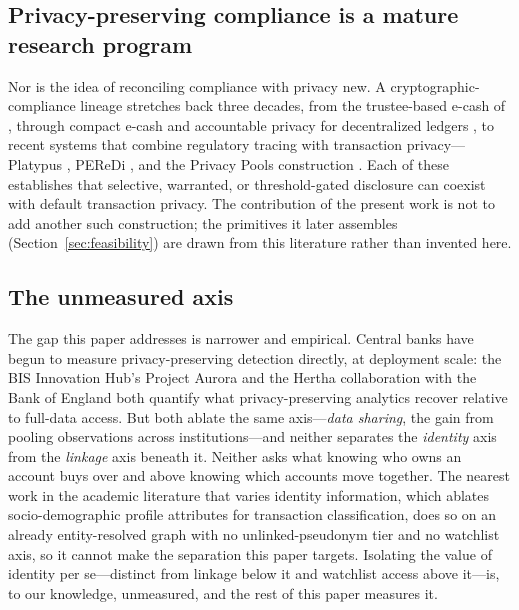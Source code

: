 \documentclass[11pt]{article}
\begin{document}
\subsection{Privacy-preserving compliance is a mature research program}

Nor is the idea of reconciling compliance with privacy new. A cryptographic-compliance lineage
stretches back three decades, from the trustee-based e-cash of \citet{CamenischMaurerStadler1996},
through compact e-cash \citep{Camenisch2005CompactEcash} and accountable privacy for decentralized
ledgers \citep{Garman2016Accountable}, to recent systems that combine regulatory tracing with
transaction privacy---Platypus \citep{Wuest2022Platypus}, PEReDi \citep{Kiayias2022PEReDi}, and the
Privacy Pools construction \citep{Buterin2024PrivacyPools}. Each of these establishes that selective,
warranted, or threshold-gated disclosure can coexist with default transaction privacy. The
contribution of the present work is not to add another such construction; the primitives it later
assembles (Section~\ref{sec:feasibility}) are drawn from this literature rather than invented here.

\subsection{The unmeasured axis}

The gap this paper addresses is narrower and empirical. Central banks have begun to measure
privacy-preserving detection directly, at deployment scale: the BIS Innovation Hub's Project Aurora
\citep{BISAurora2023} and the Hertha collaboration with the Bank of England \citep{BISHertha2025}
both quantify what privacy-preserving analytics recover relative to full-data access. But both ablate
the same axis---\emph{data sharing}, the gain from pooling observations across institutions---and
neither separates the \emph{identity} axis from the \emph{linkage} axis beneath it. Neither asks what
knowing who owns an account buys over and above knowing which accounts move together. The nearest
work in the academic literature that varies identity information, which ablates socio-demographic
profile attributes for transaction classification, does so on an already entity-resolved graph with
no unlinked-pseudonym tier and no watchlist axis, so it cannot make the separation this paper
targets. Isolating the value of identity per se---distinct from linkage below it and watchlist access
above it---is, to our knowledge, unmeasured, and the rest of this paper measures it.
\end{document}
